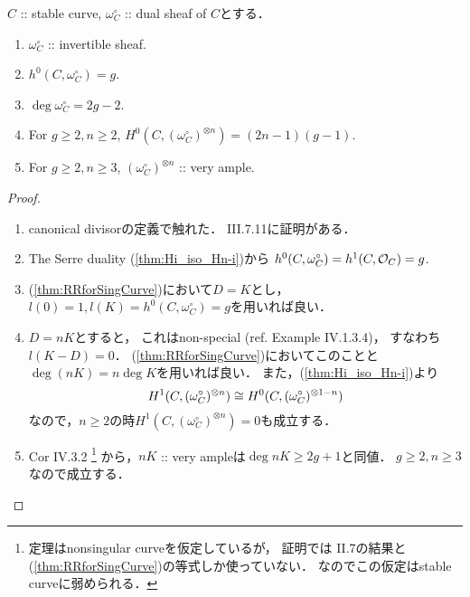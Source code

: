 \documentclass[a4paper]{jsarticle}
\newcommand{\dualsh}{\omega^{\circ}}
\begin{document}
    \begin{Prop}
        $C$ :: stable curve, $\dualsh_C$ :: dual sheaf of $C$とする．
        \begin{enumerate}[label=(\roman*), leftmargin=*]
            \item $\dualsh_C$ :: invertible sheaf.
            \item $h^0(C, \dualsh_C)=g$.
            \item $\deg \dualsh_C=2g-2$.
            \item For $g \geq 2, n \geq 2$, $H^0(C, (\dualsh_C)^{\otimes n})=(2n-1)(g-1)$.
            \item For $g \geq 2, n \geq 3$, $(\dualsh_C)^{\otimes n}$ :: very ample.
        \end{enumerate}
    \end{Prop}
    \begin{proof}
        \begin{enumerate}[label=(\roman*), leftmargin=*]
        \item
        canonical divisorの定義で触れた．
        \cite{HarAG} III.7.11に証明がある．

        \item
        The Serre duality (\ref{thm:Hi_iso_Hn-i})から
        $h^0(C, \dualsh_C)=h^1(C, \shO_C)=g$.

        \item
        (\ref{thm:RRforSingCurve})において$D=K$とし，
        $l(0)=1, l(K)=h^0(C, \dualsh_C)=g$を用いれば良い．

        \item
        $D=nK$とすると，
        これはnon-special (ref. \cite{HarAG} Example IV.1.3.4)，
        すなわち$l(K-D)=0$．
        (\ref{thm:RRforSingCurve})においてこのことと$\deg (nK)=n \deg K$を用いれば良い．
        また，(\ref{thm:Hi_iso_Hn-i})より
        \[ H^1(C, (\dualsh_C)^{\otimes n}) \iso H^0(C, (\dualsh_C)^{\otimes 1-n}) \]
        なので，$n \geq 2$の時$H^1(C, (\dualsh_C)^{\otimes n})=0$も成立する．

        \item
        \cite{HarAG} Cor IV.3.2
        \footnote
        {
            定理はnonsingular curveを仮定しているが，
            証明では\cite{HarAG} II.7の結果と(\ref{thm:RRforSingCurve})の等式しか使っていない．
            なのでこの仮定はstable curveに弱められる．
        }
        から，$nK$ :: very ampleは$\deg nK \geq 2g+1$と同値．
        $g \geq 2, n \geq 3$なので成立する．
        \end{enumerate}
    \end{proof}
\end{document}
